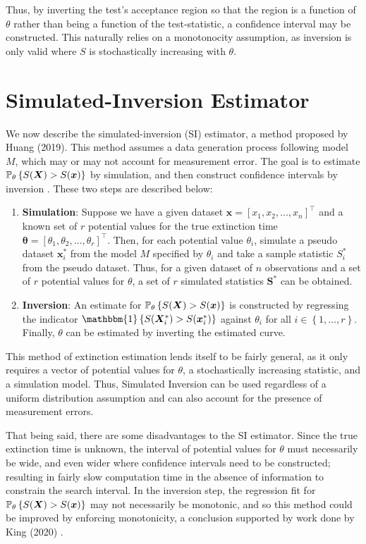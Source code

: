 Thus, by inverting the test's acceptance region so that the region is a function of $\theta$ rather than being a function of the test-statistic, a confidence interval may be constructed. This naturally relies on a monotonocity assumption, as inversion is only valid where $S$ is stochastically increasing with $\theta$.

\section{Simulated-Inversion Estimator}

We now describe the simulated-inversion (SI) estimator, a method proposed by Huang (2019). This method assumes a data generation process following model $M$, which may or may not account for measurement error. The goal is to estimate $\mathbb{P}_\theta\left\{S(\bm{X}) > S(\bm{x})\right\}$ by simulation, and then construct confidence intervals by inversion \parencite{Huang2019}. These two steps are described below:

\begin{enumerate}
    \item \textbf{Simulation}: Suppose we have a given dataset $\bm{x} = [x_1, x_2, \dots, x_n]^\top$ and a known set of $r$ potential values for the true extinction time $\bm{\theta} = [\theta_1, \theta_2, \dots, \theta_r]^\top$. Then, for each potential value $\theta_i$, simulate a pseudo dataset $\bm{x}^*_i$ from the model $M$ specified by $\theta_i$ and take a sample statistic $S^*_i$ from the pseudo dataset. Thus, for a given dataset of $n$ observations and a set of $r$ potential values for $\theta$, a set of $r$ simulated statistics $\bm{S}^*$ can be obtained.
    \item \textbf{Inversion}: An estimate for $\mathbb{P}_\theta\left\{S(\bm{X}) > S(\bm{x})\right\}$ is constructed by regressing the indicator $\mathbbm{1}\left\{ S(\bm{X}^*_i) > S(\bm{x}^*_i) \right\}$ against $\theta_i$ for all $i \in \left\{ 1, \dots, r \right\}$. Finally, $\theta$ can be estimated by inverting the estimated curve.
\end{enumerate}

This method of extinction estimation lends itself to be fairly general, as it only requires a vector of potential values for $\theta$, a stochastically increasing statistic, and a simulation model. Thus, Simulated Inversion can be used regardless of a uniform distribution assumption and can also account for the presence of measurement errors.

That being said, there are some disadvantages to the SI estimator. Since the true extinction time is unknown, the interval of potential values for $\theta$ must necessarily be wide, and even wider where confidence intervals need to be constructed; resulting in fairly slow computation time in the absence of information to constrain the search interval. In the inversion step, the regression fit for $\mathbb{P}_\theta\left\{S(\bm{X}) > S(\bm{x})\right\}$ may not necessarily be monotonic, and so this method could be improved by enforcing monotonicity, a conclusion supported by work done by King (2020) \parencite{King2020}.

